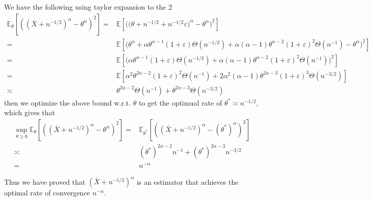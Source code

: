 \documentclass[11pt,a4paper]{ctexart}
\numberwithin{equation}{section}%
\begin{document}
We have the following using taylor expansion to the 2
\begin{align*}
    \mathbb{E}_\theta \left[ ((\bar{X}+n^{-1/2})^\alpha -\theta ^\alpha )^2 \right]
    =& \mathbb{E}\left[ \Big(\big( \theta + n^{-1/2} + n^{-1/2}\varepsilon  \big)^\alpha -\theta ^\alpha \Big)^2  \right]   \\  
    =& \mathbb{E}\left[ \big(  \theta^\alpha  + \alpha \theta ^{\alpha -1}(1+\varepsilon )\Theta (n^{-1/2}) + \alpha (\alpha -1)\theta ^{\alpha -2}(1+\varepsilon )^2 \Theta (n^{-1}) -\theta ^\alpha   \big)^2 \right] \\
    =&\mathbb{E}\left[ \big(   \alpha \theta ^{\alpha -1}(1+\varepsilon )\Theta (n^{-1/2}) + \alpha (\alpha -1)\theta ^{\alpha -2}(1+\varepsilon )^2 \Theta (n^{-1})   \big)^2 \right] \\
    =&\mathbb{E}\left[ \alpha ^2\theta ^{2\alpha -2}(1+\varepsilon )^2\Theta (n^{-1}) + 2\alpha ^2(\alpha -1)\theta ^{2\alpha -3}(1+\varepsilon )^3\Theta (n^{-3/2}) \right]\\
    \asymp & \theta ^{2\alpha -2}\Theta (n^{-1}) + \theta ^{2\alpha -3}\Theta (n^{-3/2})
\end{align*}
then we optimize the above bound w.r.t. $ \theta $ to get the optimual rate of $ \theta ^* \asymp n^{-1/2} $, which gives that
\begin{align*}
    \sup_{\theta \geq 0} \mathbb{E}_\theta \left[ ((\bar{X}+n^{-1/2})^\alpha -\theta ^\alpha )^2 \right] =&\mathbb{E}_{\theta ^*}\left[ ((\bar{X}+n^{-1/2})^\alpha -(\theta ^*) ^\alpha )^2 \right]\\
    \asymp & (\theta ^*)^{2\alpha -2}n^{-1} + (\theta ^*)^{2\alpha -3}n^{-3/2} \\
    =& n^{-\alpha }
\end{align*}



Thus we have proved that $ (\bar{X}+n^{-1/2})^\alpha $ is an estimator that achieves the optimal rate of convergence $ n^{-\alpha } $.






    

\section{}

\subsection{}
\end{document}
